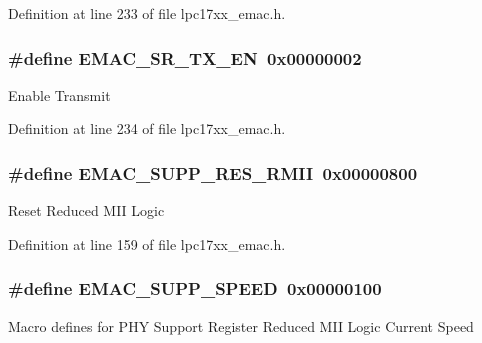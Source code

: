 \-Definition at line 233 of file lpc17xx\-\_\-emac.\-h.

\hypertarget{group___e_m_a_c___private___macros_gaaec082d0578dc9f3513a63123cc8318b}{
\subsubsection[{\-E\-M\-A\-C\-\_\-\-S\-R\-\_\-\-T\-X\-\_\-\-E\-N}]{\setlength{\rightskip}{0pt plus 5cm}\#define {\bf \-E\-M\-A\-C\-\_\-\-S\-R\-\_\-\-T\-X\-\_\-\-E\-N}~0x00000002}}\label{group___e_m_a_c___private___macros_gaaec082d0578dc9f3513a63123cc8318b}
\-Enable \-Transmit 

\-Definition at line 234 of file lpc17xx\-\_\-emac.\-h.

\hypertarget{group___e_m_a_c___private___macros_ga066831afd0fdf3c508522604e6c1922d}{
\subsubsection[{\-E\-M\-A\-C\-\_\-\-S\-U\-P\-P\-\_\-\-R\-E\-S\-\_\-\-R\-M\-I\-I}]{\setlength{\rightskip}{0pt plus 5cm}\#define {\bf \-E\-M\-A\-C\-\_\-\-S\-U\-P\-P\-\_\-\-R\-E\-S\-\_\-\-R\-M\-I\-I}~0x00000800}}\label{group___e_m_a_c___private___macros_ga066831afd0fdf3c508522604e6c1922d}
\-Reset \-Reduced \-M\-I\-I \-Logic 

\-Definition at line 159 of file lpc17xx\-\_\-emac.\-h.

\hypertarget{group___e_m_a_c___private___macros_gad2ecdc63e97958e95d6e6ac7a98492b7}{
\subsubsection[{\-E\-M\-A\-C\-\_\-\-S\-U\-P\-P\-\_\-\-S\-P\-E\-E\-D}]{\setlength{\rightskip}{0pt plus 5cm}\#define {\bf \-E\-M\-A\-C\-\_\-\-S\-U\-P\-P\-\_\-\-S\-P\-E\-E\-D}~0x00000100}}\label{group___e_m_a_c___private___macros_gad2ecdc63e97958e95d6e6ac7a98492b7}
\-Macro defines for \-P\-H\-Y \-Support \-Register \-Reduced \-M\-I\-I \-Logic \-Current \-Speed 

